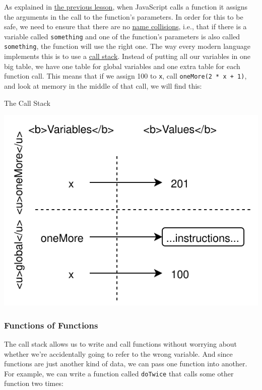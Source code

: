 As explained in \protect\hyperlink{s:basics}{the previous lesson}, when
JavaScript calls a function it assigns the arguments in the call to the
function's parameters. In order for this to be safe, we need to ensure
that there are no \protect\hyperlink{g:name-collision}{name collisions},
i.e., that if there is a variable called \texttt{something} and one of
the function's parameters is also called \texttt{something}, the
function will use the right one. The way every modern language
implements this is to use a \protect\hyperlink{g:call-stack}{call
stack}. Instead of putting all our variables in one big table, we have
one table for global variables and one extra table for each function
call. This means that if we assign 100 to \texttt{x}, call
\texttt{oneMore(2\ *\ x\ +\ 1)}, and look at memory in the middle of
that call, we will find this:

The Call Stack

\includegraphics{../../files/callbacks-call-stack.svg}

\subsubsection{Functions of Functions}\label{s:callbacks-func}

The call stack allows us to write and call functions without worrying
about whether we're accidentally going to refer to the wrong variable.
And since functions are just another kind of data, we can pass one
function into another. For example, we can write a function called
\texttt{doTwice} that calls some other function two times:

